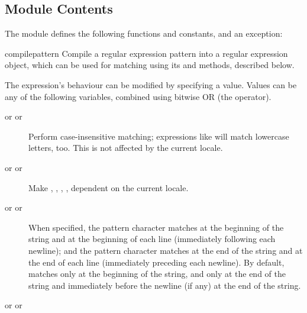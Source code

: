 \subsection{Module Contents}

The module defines the following functions and constants, and an exception:


\begin{funcdesc}{compile}{pattern}
  Compile a regular expression pattern into a regular expression
  object, which can be used for matching using its  and
   methods, described below.  

  The expression's behaviour can be modified by specifying a
   value.  Values can be any of the following variables,
  combined using bitwise OR (the \code{|} operator).

\begin{description}


\item[ or  or \quad]

Perform case-insensitive matching; expressions like \code{[A-Z]} will match
lowercase letters, too.  This is not affected by the current locale.

\item[ or  or \quad]

Make , , ,
, dependent on the current locale. 

\item[ or  or \quad]

When specified, the pattern character \code{\^} matches at the
beginning of the string and at the beginning of each line
(immediately following each newline); and the pattern character
\code{\$} matches at the end of the string and at the end of each line
(immediately preceding each newline).
By default, \code{\^} matches only at the beginning of the string, and
\code{\$} only at the end of the string and immediately before the
newline (if any) at the end of the string. 

\item[ or  or \quad]


\end{description}
\end{funcdesc}
